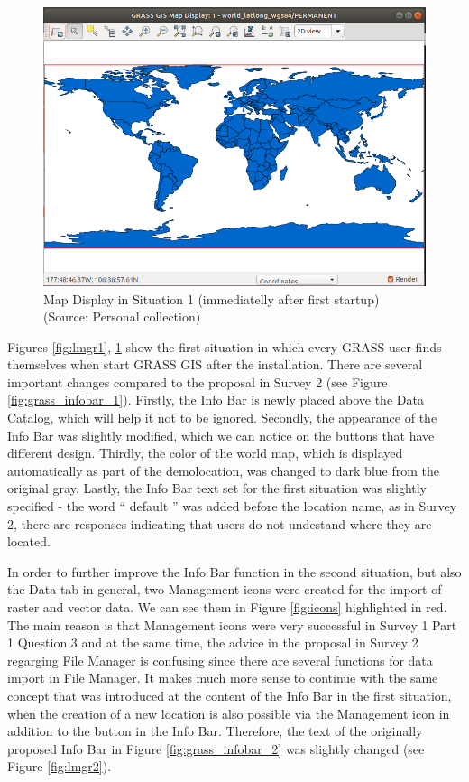 \documentclass[a4paper,10pt,twoside]{article}
\begin{document}
\vspace{0.3cm}
\begin{figure}[hbt!] 
\begin{center}
\includegraphics[width=13cm]{../pictures/mapdisplay1.png} 
\caption[Map Display in Situation 1 (immediatelly after first startup)]{Map Display in Situation 1 (immediatelly after first startup) (Source: Personal collection)}
\label{fig:mapdisplay1}
\end{center}
\end{figure}

\noindent Figures \ref{fig:lmgr1}, \ref{fig:mapdisplay1} show the
first situation in which every GRASS user finds themselves when start
GRASS GIS after the installation. There are several important changes
compared to the proposal in Survey 2 (see Figure
\ref{fig:grass_infobar_1}). Firstly, the Info Bar is newly placed
above the Data Catalog, which will help it not to be
ignored. Secondly, the appearance of the Info Bar was slightly
modified, which we can notice on the buttons that have different
design. Thirdly, the color of the world map, which is displayed
automatically as part of the demolocation, was changed to dark blue
from the original gray. Lastly, the Info Bar text set for the first
situation was slightly specified - the word `` default '' was added
before the location name, as in Survey 2, there are responses
indicating that users do not undestand where they are located.

In order to further improve the Info Bar function in the second
situation, but also the Data tab in general, two Management icons were
created for the import of raster and vector data. We can see them in
Figure \ref{fig:icons} highlighted in red. The main reason is that
Management icons were very successful in Survey 1 Part 1 Question 3
and at the same time, the advice in the proposal in Survey 2 regarging
File Manager is confusing since there are several functions for data
import in File Manager. It makes much more sense to continue with the
same concept that was introduced at the content of the Info Bar in the
first situation, when the creation of a new location is also possible
via the Management icon in addition to the button in the Info Bar.
Therefore, the text of the originally proposed Info Bar in Figure
\ref{fig:grass_infobar_2} was slightly changed (see Figure
\ref{fig:lmgr2}).
\end{document}
